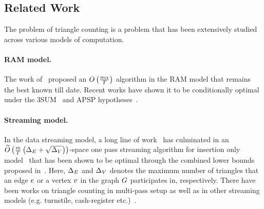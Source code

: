 







\subsection{Related Work}
\label{ssec:related work}
The problem of triangle counting is a problem that has been extensively studied across various models of computation. 
\paragraph{RAM model.}
The work of~\citep{DBLP:journals/siamcomp/ChibaN85} proposed an $O\left({{\frac{m\alpha}{T}}}\right)$ algorithm in the RAM model that remains the best known till date. Recent works  have shown it to be conditionally optimal under the 3SUM~\citep{DBLP:conf/soda/KopelowitzPP16} and APSP hypotheses~\citep{DBLP:conf/focs/WilliamsX20}. 
\paragraph{Streaming model.}
In the data streaming model, a long line of work~\citep{DBLP:journals/ipl/PaghT12,DBLP:journals/pvldb/PavanTTW13} has culminated in an $\widetilde{O}\left({{\frac{m}{T}\left({\Delta_E+\sqrt{\Delta_V}}\right)}}\right)$-space one pass streaming algorithm for insertion only model~\citep{KallaugherP17} that has been shown to be optimal through the combined lower bounds proposed in~\citep{BOV_13_Streaming_triangle_counting_hardness,KallaugherP17}. Here,  $\Delta_E$ and $\Delta_V$  denotes the maximum number of triangles that an edge $e$ or a vertex $v$ in the graph $G$ participates in, respectively. There have been works on triangle counting in multi-pass setup as well as in other streaming models (e.g. turnstile, cash-register etc.)~\citep{DBLP:conf/pods/McGregorVV16,DBLP:conf/stacs/BeraC17}.

